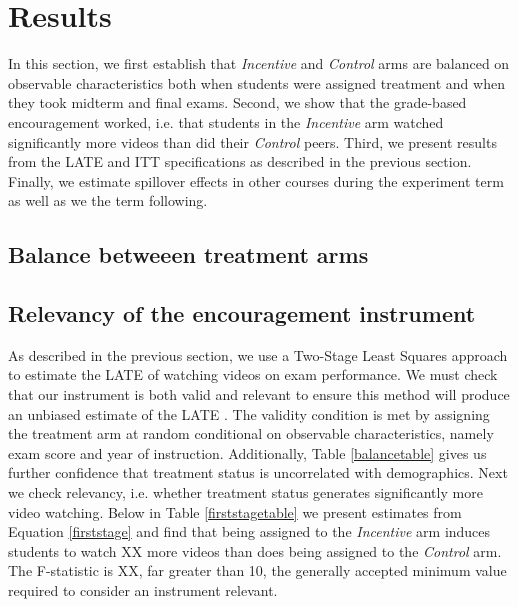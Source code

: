 \documentclass[12pt]{article}
\begin{document}

\section{Results} \label{results}

In this section, we first establish that \textit{Incentive} and \textit{Control} arms are balanced on observable characteristics both when students were assigned treatment and when they took midterm and final exams. Second, we show that the grade-based encouragement worked, i.e. that students in the \textit{Incentive} arm watched significantly more videos than did their \textit{Control} peers. Third, we present results from the LATE and ITT specifications as described in the previous section. Finally, we estimate spillover effects in other courses during the experiment term as well as we the term following.

\subsection{Balance betweeen treatment arms}

\subsection{Relevancy of the encouragement instrument}

As described in the previous section, we use a Two-Stage Least Squares approach to estimate the LATE of watching videos on exam performance. We must check that our instrument is both valid and relevant to ensure this method will produce an unbiased estimate of the LATE \parencite{ir2015}. The validity condition is met by assigning the treatment arm at random conditional on observable characteristics, namely exam score and year of instruction. Additionally, Table \ref{balancetable} gives us further confidence that treatment status is uncorrelated with demographics. Next we check relevancy, i.e. whether treatment status generates significantly more video watching. Below in Table \ref{firststagetable} we present estimates from Equation \ref{firststage} and find that being assigned to the \textit{Incentive} arm induces students to watch XX more videos than does being assigned to the \textit{Control} arm. The F-statistic is XX, far greater than 10, the generally accepted minimum value required to consider an instrument relevant.
\end{document}
